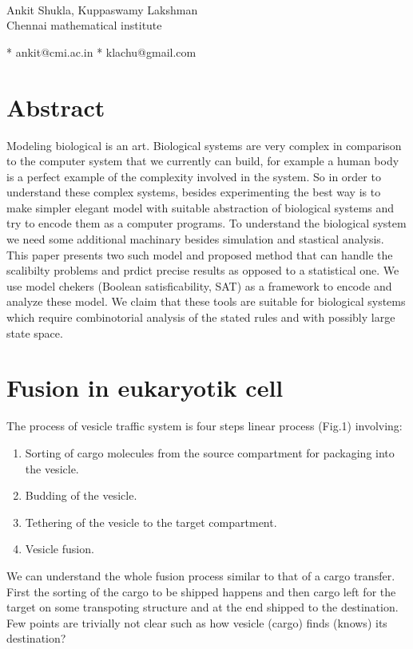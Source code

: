 \documentclass[preprint,12pt]{elsarticle}
\begin{document}
\vspace*{0.2in}

\begin{flushleft}
{\Large
\textbf{}}

\newline
\\
Ankit Shukla, Kuppaswamy Lakshman 
\\
\bigskip
Chennai mathematical institute
\bigskip

* ankit@cmi.ac.in
* klachu@gmail.com
\end{flushleft}

\section*{Abstract}
Modeling biological is an art. Biological systems are very complex in comparison to the computer system that we currently can build, for example a human body is a perfect example of the complexity involved in the system. So in order to understand these complex systems, besides experimenting the best way is to make simpler elegant model with suitable abstraction of biological systems and try to encode them as a computer programs. To understand the biological system we need some additional machinary besides simulation and stastical analysis. This paper presents two such model and proposed method that can handle the scalibilty problems and prdict precise results as opposed to a statistical one. We use model chekers (Boolean satisficability, SAT) as a framework to encode and analyze these model. We claim that these tools are suitable for biological systems which require combinotorial analysis of the stated rules and with possibly large state space.

\section{Fusion in eukaryotik cell}
The process of vesicle traffic system is four steps linear process (Fig.1) involving:  
\begin{enumerate}
\item Sorting of cargo molecules from the source compartment for packaging into the vesicle.
\item Budding of the vesicle.
\item Tethering of the vesicle to the target compartment.
\item Vesicle fusion.
\end{enumerate}
We can understand the whole fusion process similar to that of a cargo transfer. First the sorting of the cargo to be shipped happens and then cargo left for the target on some transpoting structure and at the end shipped to the destination. Few points are trivially not clear such as how vesicle (cargo) finds (knows) its destination?
\end{document}
